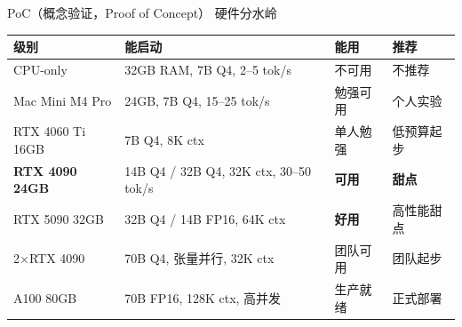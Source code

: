 \documentclass[UTF8,11pt,aspectratio=169]{beamer}
\begin{document}
\begin{frame}{PoC（概念验证，Proof of Concept） 硬件分水岭}
  \small
  \begin{table}
    \centering
    \begin{tabular}{p{2.8cm}p{6cm}p{1.5cm}p{2.0cm}}
      \toprule
      \textbf{级别}                & \textbf{能启动}                           & \textbf{能用}                        & \textbf{推荐} \\
      \midrule
      CPU-only                    & 32GB RAM, 7B Q4, 2--5 tok/s             & 不可用                               & 不推荐        \\
      Mac Mini M4 Pro             & 24GB, 7B Q4, 15--25 tok/s               & 勉强可用                             & 个人实验      \\
      RTX 4060 Ti 16GB            & 7B Q4, 8K ctx                           & 单人勉强                             & 低预算起步    \\
      \rowcolor{green!15}
      \textbf{RTX 4090 24GB}      & 14B Q4 / 32B Q4, 32K ctx, 30--50 tok/s  & \textbf{可用}                        & \textbf{甜点} \\
      RTX 5090 32GB               & 32B Q4 / 14B FP16, 64K ctx              & \textbf{好用}                        & 高性能甜点    \\
      2$\times$RTX 4090           & 70B Q4, 张量并行, 32K ctx               & 团队可用                             & 团队起步      \\
      A100 80GB                   & 70B FP16, 128K ctx, 高并发              & 生产就绪                             & 正式部署      \\
      \bottomrule
    \end{tabular}
  \end{table}
\end{frame}
\end{document}
